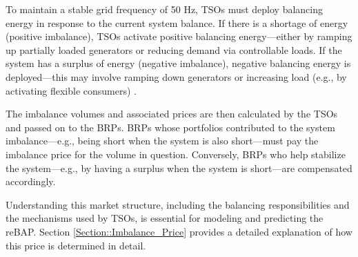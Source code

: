 \documentclass[class=scrbook, crop=false]{standalone}
\begin{document}
To maintain a stable grid frequency of 50 Hz, \gls{TSO}s must deploy balancing energy in response to the current system balance. If there is a shortage of energy (positive imbalance), \gls{TSO}s activate positive balancing energy—either by ramping up partially loaded generators or reducing demand via controllable loads. If the system has a surplus of  energy (negative imbalance), negative balancing energy is deployed—this may involve ramping down generators or increasing load (e.g., by activating flexible consumers) \cite{ActivatingReserves}. 

The imbalance volumes and associated prices are then calculated by the \gls{TSO}s and passed on to the  \gls{BRP}s.  \gls{BRP}s whose portfolios contributed to the system imbalance—e.g., being short when the system is also short—must pay the imbalance price for the volume in question. Conversely, \gls{BRP}s who help stabilize the system—e.g., by having a surplus when the system is short—are compensated accordingly. 

Understanding this market structure, including the balancing responsibilities and the mechanisms used by  \gls{TSO}s, is essential for modeling and predicting the  \gls{reBAP}. Section \ref{Section::Imbalance_Price} provides a detailed explanation of how this price is determined in detail. 




\end{document}

